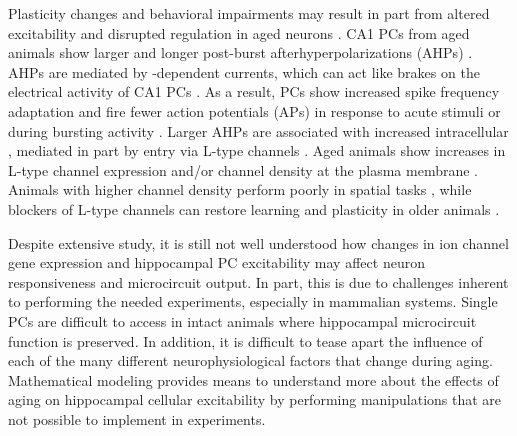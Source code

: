 \documentclass[12pt]{article}
\begin{document}
Plasticity changes and behavioral impairments may result in part from altered excitability and disrupted {\Ca} regulation
in aged neurons
\citep{oh2010learning,rizzo2015dissecting,rosenzweig2003impact}. CA1 PCs from aged animals show larger and longer post-burst afterhyperpolarizations (AHPs)
\citep{kumar200217beta,kumar2007environmental,landfield1984prolonged,gant2009action,power2002age}. AHPs
are mediated by {\Ca}-dependent {\K} currents, which can act like brakes on the electrical activity of CA1 PCs
\citep{alger1980epileptiform,hotson1980calcium}. As a result, PCs show increased spike frequency adaptation and fire fewer action potentials (APs) in response to acute stimuli  or during bursting activity 
\citep{gant2006early,moyer1992nimodipine,tombaugh2005slow}. Larger AHPs are associated with increased intracellular {\Ca}, mediated in part
by {\Ca} entry via L-type channels
\citep{campbell1996aging,moyer1992nimodipine,power2002age,tanabe1998type,thibault2001elevated}. Aged
animals show increases in L-type channel expression and/or channel
density at the plasma membrane
\citep{herman1998up,thibault1996increase,veng2002regionally,veng2003age,nunez2014surface}.
Animals with higher {\Ca} channel density perform poorly in spatial
tasks 
\citep{thibault1996increase}, while blockers of L-type channels can
restore learning and plasticity in older animals
\citep{norris1998reversal,sandin1990aging,scriabine1989pharmacological}.

Despite extensive study, it is still not well understood how changes
in ion
channel gene expression and hippocampal PC excitability may affect neuron
responsiveness and microcircuit output. In part, this is due
to challenges inherent to performing the needed experiments,
especially in mammalian systems. Single PCs are difficult
to access in intact animals where hippocampal microcircuit function is
preserved. In addition, it is difficult to tease apart the influence of each of the many different neurophysiological factors that
change during aging. 
Mathematical modeling provides means to understand more about the effects of aging on hippocampal cellular excitability by performing manipulations that are not possible to implement in experiments.
\end{document}
